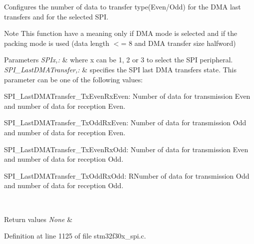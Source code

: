 Configures the number of data to transfer type(Even/\-Odd) for the D\-M\-A last transfers and for the selected S\-P\-I. 

\begin{DoxyNote}{Note}
This function have a meaning only if D\-M\-A mode is selected and if the packing mode is used (data length $<$= 8 and D\-M\-A transfer size halfword) 
\end{DoxyNote}

\begin{DoxyParams}{Parameters}
{\em S\-P\-Ix,\-:} & where x can be 1, 2 or 3 to select the S\-P\-I peripheral. \\
\hline
{\em S\-P\-I\-\_\-\-Last\-D\-M\-A\-Transfer,\-:} & specifies the S\-P\-I last D\-M\-A transfers state. This parameter can be one of the following values\-: \begin{DoxyItemize}
\item S\-P\-I\-\_\-\-Last\-D\-M\-A\-Transfer\-\_\-\-Tx\-Even\-Rx\-Even\-: Number of data for transmission Even and number of data for reception Even. \item S\-P\-I\-\_\-\-Last\-D\-M\-A\-Transfer\-\_\-\-Tx\-Odd\-Rx\-Even\-: Number of data for transmission Odd and number of data for reception Even. \item S\-P\-I\-\_\-\-Last\-D\-M\-A\-Transfer\-\_\-\-Tx\-Even\-Rx\-Odd\-: Number of data for transmission Even and number of data for reception Odd. \item S\-P\-I\-\_\-\-Last\-D\-M\-A\-Transfer\-\_\-\-Tx\-Odd\-Rx\-Odd\-: R\-Number of data for transmission Odd and number of data for reception Odd. \end{DoxyItemize}
\\
\hline
\end{DoxyParams}

\begin{DoxyRetVals}{Return values}
{\em None} & \\
\hline
\end{DoxyRetVals}


Definition at line 1125 of file stm32f30x\-\_\-spi.\-c.

